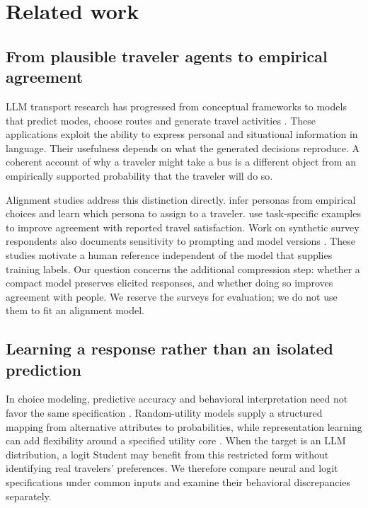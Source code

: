 \section{Related work}
\label{sec:related}
\subsection{From plausible traveler agents to empirical agreement}
LLM transport research has progressed from conceptual frameworks to models that predict modes, choose routes and generate travel activities \citep{liu2025framework,nie2025roles,mo2026llmtravel,wang2025agentic,gatsim2026}. These applications exploit the ability to express personal and situational information in language. Their usefulness depends on what the generated decisions reproduce. A coherent account of why a traveler might take a bus is a different object from an empirically supported probability that the traveler will do so.

Alignment studies address this distinction directly. \citet{liu2026persona} infer personas from empirical choices and learn which persona to assign to a traveler. \citet{xu2026satisfaction} use task-specific examples to improve agreement with reported travel satisfaction. Work on synthetic survey respondents also documents sensitivity to prompting and model versions \citep{argyle2023out,aher2023using,bisbee2024synthetic}. These studies motivate a human reference independent of the model that supplies training labels. Our question concerns the additional compression step: whether a compact model preserves elicited responses, and whether doing so improves agreement with people. We reserve the surveys for evaluation; we do not use them to fit an alignment model.

\subsection{Learning a response rather than an isolated prediction}
In choice modeling, predictive accuracy and behavioral interpretation need not favor the same specification \citep{wang2020deep,martinbaos2023prediction}. Random-utility models supply a structured mapping from alternative attributes to probabilities, while representation learning can add flexibility around a specified utility core \citep{mcfadden1974conditional,train2009discrete,sifringer2020enhancing}. When the target is an LLM distribution, a logit Student may benefit from this restricted form without identifying real travelers' preferences. We therefore compare neural and logit specifications under common inputs and examine their behavioral discrepancies separately.


